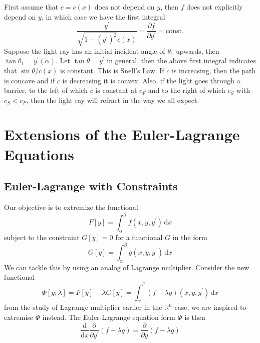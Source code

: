 \documentclass{article}
\begin{document}
First assume that $c=c(x)$ does not depend on $y$, then $f$ does not explicitly depend on $y$, in which case we have the first integral
$$\frac{y^\prime}{\sqrt{1+(y^\prime)^2}c(x)}=\frac{\partial f}{\partial y^\prime}=\text{const.}$$
Suppose the light ray has an initial incident angle of $\theta_1$ upwards, then $\tan\theta_1=y^\prime(\alpha)$.
Let $\tan\theta=y^\prime$ in general, then the above first integral indicates that $\sin\theta/c(x)$ is constant.
This is Snell's Law.
If $c$ is increasing, then the path is concave and if $c$ is decreasing it is convex.
Also, if the light goes through a barrier, to the left of which $c$ is constant at $c_F$ and to the right of which $c_S$ with $c_S<c_F$, then the light ray will refract in the way we all expect.

\newpage

\section{Extensions of the Euler-Lagrange Equations}
\subsection{Euler-Lagrange with Constraints}
Our objective is to extremize the functional
$$F[y]=\int_\alpha^\beta f(x,y,y^\prime)\,\mathrm dx$$
subject to the constraint $G[y]=0$ for a functional $G$ in the form
$$G[y]=\int_\alpha^\beta g(x,y,y^\prime)\,\mathrm dx$$
We can tackle this by using an analog of Lagrange multiplier.
Consider the new functional
$$\Phi[y;\lambda]=F[y]-\lambda G[y]=\int_\alpha^\beta (f-\lambda g)(x,y,y^\prime)\,\mathrm dx$$
from the study of Lagrange multiplier earlier in the $\mathbb R^n$ case, we are inspired to extremise $\Phi$ instead.
The Euler-Lagrange equation form $\Phi$ is then
$$\frac{\mathrm d}{\mathrm dx}\frac{\partial}{\partial y^\prime}(f-\lambda g)=\frac{\partial}{\partial y}(f-\lambda g)$$
\end{document}
